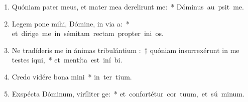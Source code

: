 \begin{flushleft}
\begin{enumerate}[leftmargin=*]
\item Quóniam pater meus, et mater mea derelirunt me:~* \mbox{Dóminus au psit me.}
\item Legem pone mihi, Dómine, in via a:~* \mbox{et dírige me in sémitam rectam propter ini os.}
\item Ne tradíderis me in ánimas tribulántium :~† quóniam insurrexérunt in me testes iqui,~* \mbox{et mentíta est iní bi.}
\item Credo vidére bona mini~* \mbox{in ter tium.}
\item Exspécta Dóminum, viríliter ge:~* \mbox{et confortétur cor tuum, et sú minum.}


\end{enumerate}
\end{flushleft}

